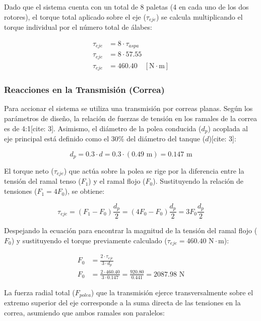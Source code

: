 \documentclass[12pt, a4paper]{article}
\begin{document}
Dado que el sistema cuenta con un total de 8 paletas (4 en cada uno de los dos rotores), el torque total aplicado sobre el eje ($\tau_{eje}$) se calcula multiplicando el torque individual por el número total de álabes:

\begin{align}
    \tau_{eje} &= 8 \cdot \tau_{aspa} \\[6pt]
    \tau_{eje} &= 8 \cdot 57.55 \\[6pt]
    \tau_{eje} &= 460.40 \quad [\text{N}\cdot\text{m}]
\end{align}

\subsubsection{Reacciones en la Transmisión (Correa)}

Para accionar el sistema se utiliza una transmisión por correas planas. Según los parámetros de diseño, la relación de fuerzas de tensión en los ramales de la correa es de 4:1[cite: 3]. Asimismo, el diámetro de la polea conducida ($d_p$) acoplada al eje principal está definido como el 30\% del diámetro del tanque ($d$)[cite: 3]:

\begin{equation}
    d_p = 0.3 \cdot d = 0.3 \cdot (0.49 \text{ m}) = 0.147 \text{ m}
\end{equation}

El torque neto ($\tau_{eje}$) que actúa sobre la polea se rige por la diferencia entre la tensión del ramal tenso ($F_1$) y el ramal flojo ($F_0$). Sustituyendo la relación de tensiones ($F_1 = 4F_0$), se obtiene:

\begin{equation}
    \tau_{eje} = (F_1 - F_0) \frac{d_p}{2} = (4F_0 - F_0) \frac{d_p}{2} = 3F_0 \frac{d_p}{2}
\end{equation}

Despejando la ecuación para encontrar la magnitud de la tensión del ramal flojo ($F_0$) y sustituyendo el torque previamente calculado ($\tau_{eje} = 460.40 \text{ N}\cdot\text{m}$):

\begin{align}
    F_0 &= \frac{2 \cdot \tau_{eje}}{3 \cdot d_p} \\[6pt]
    F_0 &= \frac{2 \cdot 460.40}{3 \cdot 0.147} = \frac{920.80}{0.441} = 2087.98 \text{ N}
\end{align}

La fuerza radial total ($F_{polea}$) que la transmisión ejerce transversalmente sobre el extremo superior del eje corresponde a la suma directa de las tensiones en la correa, asumiendo que ambos ramales son paralelos:
\end{document}
